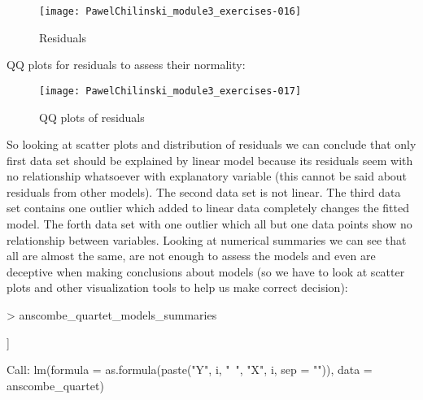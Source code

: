 \documentclass[a4paper]{article}
\begin{document}
\begin{itemize}
\begin{figure}[H]
\begin{center}
\begin{Schunk}
\end{Schunk}
\texttt{[image: PawelChilinski\_module3\_exercises-016]}
\caption{Residuals}
\end{center}
\end{figure}
QQ plots for residuals to assess their normality:
\begin{figure}[H]
\begin{center}
\begin{Schunk}
\end{Schunk}
\texttt{[image: PawelChilinski\_module3\_exercises-017]}
\caption{QQ plots of residuals}
\end{center}
\end{figure}
So looking at scatter plots and distribution of residuals we can conclude that only first data set should be explained by linear model because its residuals seem with no relationship whatsoever with explanatory variable (this cannot be said about residuals from other models). The second data set is not linear. The third data set contains one outlier which added to linear data completely changes the fitted model. The forth data set with one outlier which all but one data points show no relationship between variables.
Looking at numerical summaries we can see that all are almost the same, are not enough to assess the models and even are deceptive when making conclusions about models (so we have to look at scatter plots and other visualization tools to help us make correct decision):
\begin{Schunk}
\begin{Sinput}
> anscombe_quartet_models_summaries
\end{Sinput}
\begin{Soutput}
[[1]]

Call:
lm(formula = as.formula(paste("Y", i, "~", "X", i, sep = "")), 
    data = anscombe_quartet)


\end{Soutput}
\end{Schunk}
\end{itemize}
\end{document}
